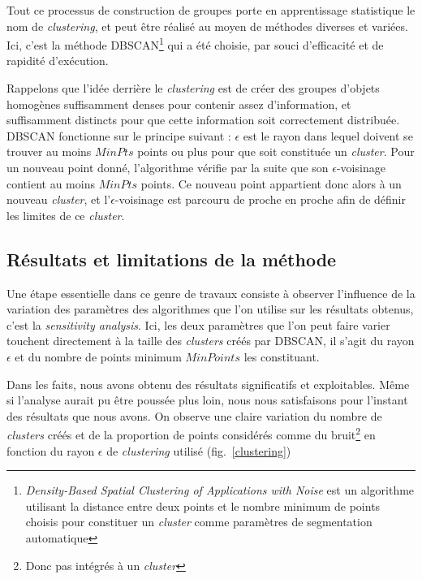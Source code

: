 \documentclass[11pt, a4paper]{article}
\begin{document}
Tout ce processus de construction de groupes porte en apprentissage statistique le nom de \textit{clustering}, et peut être réalisé au moyen de méthodes diverses et variées. Ici, c'est la méthode DBSCAN\footnote{\textit{Density-Based Spatial Clustering of Applications with Noise} est un algorithme utilisant la distance entre deux points et le nombre minimum de points choisis pour constituer un \textit{cluster} comme paramètres de segmentation automatique} qui a été choisie, par souci d'efficacité et de rapidité d'exécution.

Rappelons que l'idée derrière le \textit{clustering} est de créer des groupes d'objets homogènes suffisamment denses pour contenir assez d'information, et suffisamment distincts pour que cette information soit correctement distribuée. DBSCAN fonctionne sur le principe suivant : $\epsilon$ est le rayon dans lequel doivent se trouver au moins $MinPts$ points ou plus pour que soit constituée un \textit{cluster}. Pour un nouveau point donné, l'algorithme vérifie par la suite que son $\epsilon$-voisinage contient au moins $MinPts$ points. Ce nouveau point appartient donc alors à un nouveau \textit{cluster}, et l'$\epsilon$-voisinage est parcouru de proche en proche afin de définir les limites de ce \textit{cluster}.

\subsection{Résultats et limitations de la méthode}

Une étape essentielle dans ce genre de travaux consiste à observer l'influence de la variation des paramètres des algorithmes que l'on utilise sur les résultats obtenus, c'est la \textit{sensitivity analysis}. Ici, les deux paramètres que l'on peut faire varier touchent directement à la taille des \textit{clusters} créés par DBSCAN, il s'agit du rayon $\epsilon$ et du nombre de points minimum $MinPoints$ les constituant.

Dans les faits, nous avons obtenu des résultats significatifs et exploitables. Même si l'analyse aurait pu être poussée plus loin, nous nous satisfaisons pour l'instant des résultats que nous avons. On observe une claire variation du nombre de \textit{clusters} créés et de la proportion de points considérés comme du bruit\footnote{Donc pas intégrés à un \textit{cluster}} en fonction du rayon $\epsilon$ de \textit{clustering} utilisé (fig.~\ref{clustering})
\end{document}
